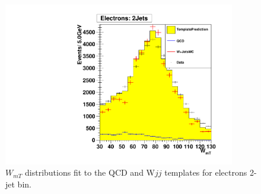 \begin{figure}[h!] {\centering
{}\linewidth
\includegraphics[width=0.90\textwidth]{plots/qcd/TemplateFit_WmT_el2j.pdf}
\caption{$W_{mT}$ distributions fit to the QCD and W$jj$ templates for electrons 2-jet bin.}
\label{fig:QCDTemplateFit_MET}
}
\end{figure}
